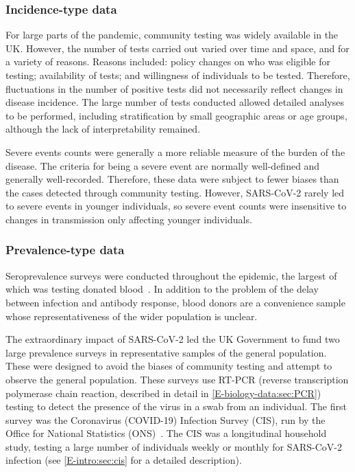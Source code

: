 \documentclass[thesis.tex]{subfiles}
\begin{document}
\subsubsection{Incidence-type data}

For large parts of the pandemic, community testing was widely available in the UK.
However, the number of tests carried out varied over time and space, and for a variety of reasons.
Reasons included: policy changes on who was eligible for testing; availability of tests; and willingness of individuals to be tested.
Therefore, fluctuations in the number of positive tests did not necessarily reflect changes in disease incidence.
The large number of tests conducted allowed detailed analyses to be performed, including stratification by small geographic areas or age groups, although the lack of interpretability remained.

Severe events counts were generally a more reliable measure of the burden of the disease.
The criteria for being a severe event are normally well-defined and generally well-recorded.
Therefore, these data were subject to fewer biases than the cases detected through community testing.
However, SARS-CoV-2 rarely led to severe events in younger individuals, so severe event counts were insensitive to changes in transmission only affecting younger individuals.

\subsubsection{Prevalence-type data}

Seroprevalence surveys were conducted throughout the epidemic, the largest of which was testing donated blood~\autocite{amirthalingamSeroprevalence}.
In addition to the problem of the delay between infection and antibody response, blood donors are a convenience sample whose representativeness of the wider population is unclear.

The extraordinary impact of SARS-CoV-2 led the UK Government to fund two large prevalence surveys in representative samples of the general population.
These were designed to avoid the biases of community testing and attempt to observe the general population.
These surveys use RT-PCR (reverse transcription polymerase chain reaction, described in detail in \cref{E-biology-data:sec:PCR}) testing to detect the presence of the virus in a swab from an individual.
The first survey was the  Coronavirus (COVID-19) Infection Survey (CIS), run by the Office for National Statistics (ONS)~\autocite{CIS,cisMethodsONS}.
The CIS was a longitudinal household study, testing a large number of individuals weekly or monthly for SARS-CoV-2 infection (see \cref{E-intro:sec:cis} for a detailed description).
\end{document}
